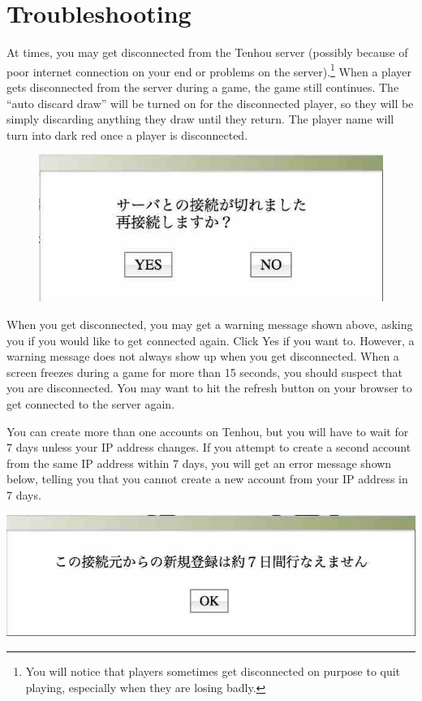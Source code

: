 \newpage
\section{Troubleshooting}

At times, you may get disconnected from the {\jap Tenhou} server (possibly because of poor internet connection on your end or problems on the server).\footnote{You will notice that players sometimes get disconnected on purpose to quit playing, especially when they are losing badly.}
When a player gets disconnected from the server during a game, the game still continues. The ``auto discard draw'' will be turned on for the disconnected player, so they will be simply discarding anything they draw until they return. The player name will turn into dark red once a player is disconnected. 

\begin{figure}
\vspace{-10pt}
\begin{center}
\includegraphics[width=.45\textwidth,clip]{figs/warning2.jpg}
\end{center}
\vspace{-10pt}
\end{figure}

\bigskip
When you get disconnected, you may get a warning message shown above, asking you if you would like to get connected again. Click Yes if you want to. However, a warning message does not always show up when you get disconnected. When a screen freezes during a game for more than 15 seconds, you should suspect that you are disconnected. You may want to hit the refresh button on your browser to get connected to the server again. 

\bigskip
You can create more than one accounts on {\jap Tenhou}, but you will have to wait for 7 days unless your IP address changes. If you attempt to create a second account from the same IP address within 7 days, you will get an error message shown below, telling you that you cannot create a new account from your IP address in 7 days. 

\begin{center}
\includegraphics[width=.5\textwidth,clip]{figs/warning1.jpg}
\end{center}

